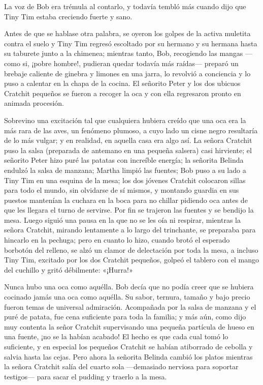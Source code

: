 \documentclass{novela}
\begin{document}
 La voz de Bob era trémula al contarlo, y todavía tembló más cuando dijo que Tiny Tim estaba creciendo fuerte y sano.

 Antes de que se hablase otra palabra, se oyeron los golpes de la activa muletita contra el suelo y Tiny Tim regresó escoltado por su hermano y su hermana hasta su taburete junto a la chimenea; mientras tanto, Bob, recogiendo las mangas ---como si, ¡pobre hombre!, pudieran quedar todavía más raídas--- preparó un brebaje caliente de ginebra y limones en una jarra, lo revolvió a conciencia y lo puso a calentar en la chapa de la cocina. El señorito Peter y los dos ubicuos Cratchit pequeños se fueron a recoger la oca y con ella regresaron pronto en animada procesión.

 Sobrevino una excitación tal que cualquiera hubiera creído que una oca era la más rara de las aves, un fenómeno plumoso, a cuyo lado un cisne negro resultaría de lo más vulgar; y en realidad, en aquella casa era algo así. La señora Cratchit puso la salsa (preparada de antemano en una pequeña salsera) casi hirviente; el señorito Peter hizo puré las patatas con increíble energía; la señorita Belinda endulzó la salsa de manzana; Martha limpió las fuentes; Bob puso a su lado a Tiny Tim en una esquina de la mesa; los dos jóvenes Cratchit colocaron sillas para todo el mundo, sin olvidarse de sí mismos, y montando guardia en sus puestos mantenían la cuchara en la boca para no chillar pidiendo oca antes de que les llegara el turno de servirse. Por fin se trajeron las fuentes y se bendijo la mesa. Luego siguió una pausa en la que no se les oía ni respirar, mientras la señora Cratchit, mirando lentamente a lo largo del trinchante, se preparaba para hincarlo en la pechuga; pero en cuanto lo hizo, cuando brotó el esperado borbotón del relleno, se alzó un clamor de delectación por toda la mesa, a incluso Tiny Tim, excitado por los dos Cratchit pequeños, golpeó el tablero con el mango del cuchillo y gritó débilmente: «¡Hurra!»

 Nunca hubo una oca como aquélla. Bob decía que no podía creer que se hubiera cocinado jamás una oca como aquélla. Su sabor, ternura, tamaño y bajo precio fueron temas de universal admiración. Acompañada por la salsa de manzana y el puré de patata, fue cena suficiente para toda la familia; y más aún, como dijo muy contenta la señor Cratchit supervisando una pequeña partícula de hueso en una fuente, ¡no se la habían acabado! El hecho es que cada cual tomó lo suficiente, y en especial los pequeños Cratchit se habían atiborrado de cebolla y salvia hasta las cejas. Pero ahora la señorita Belinda cambió los platos mientras la señora Cratchit salía del cuarto sola ---demasiado nerviosa para soportar testigos--- para sacar el pudding y traerlo a la mesa.
\end{document}

